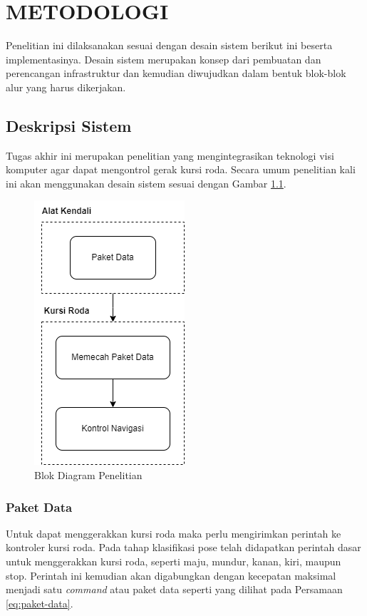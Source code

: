 \chapter{METODOLOGI}
\label{chap:metodologi}


Penelitian ini dilaksanakan sesuai dengan desain sistem berikut ini beserta implementasinya. Desain sistem merupakan konsep dari pembuatan dan perencangan infrastruktur dan kemudian diwujudkan dalam bentuk blok-blok alur yang harus dikerjakan.

\section{Deskripsi Sistem}
\label{sec:deskripsisistem}

Tugas akhir ini merupakan penelitian yang mengintegrasikan teknologi visi komputer agar dapat mengontrol gerak kursi roda. Secara umum penelitian kali ini akan menggunakan desain sistem sesuai dengan Gambar \ref{fig:Metodologi Penelitian}.

\begin{figure} [ht] \centering
    \includegraphics[scale=0.8]{gambar/DeskripsiSistem.png}
    \caption{Blok Diagram Penelitian}
    \label{fig:Metodologi Penelitian}
\end{figure}

\subsection{Paket Data}
Untuk dapat menggerakkan kursi roda maka perlu mengirimkan perintah ke kontroler kursi roda. Pada tahap klasifikasi pose telah didapatkan perintah dasar untuk menggerakkan kursi roda, seperti maju, mundur, kanan, kiri, maupun stop. Perintah ini kemudian akan digabungkan dengan kecepatan maksimal menjadi satu \emph{command} atau paket data seperti yang dilihat pada Persamaan \ref{eq:paket-data}.

